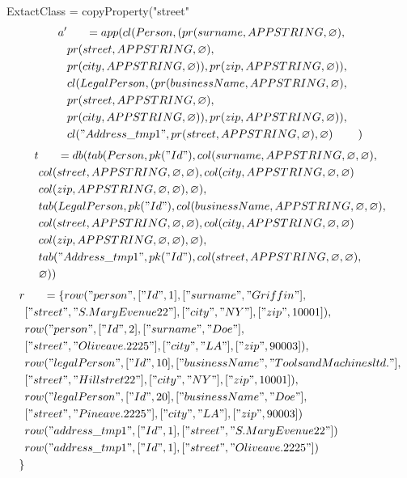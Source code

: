 \documentclass[11pt]{article}
\begin{document}
\newpage
ExtactClass = copyProperty("street"
\hline
\begin{align*}
a' & \;\;\;\;\;\; =app(cl(Person, (pr(surname, APPSTRING, \varnothing), \\
& pr(street, APPSTRING, \varnothing), \\
& pr(city, APPSTRING, \varnothing)), pr(zip, APPSTRING, \varnothing)), \\
& cl(LegalPerson, (pr(businessName, APPSTRING, \varnothing), \\
& pr(street, APPSTRING, \varnothing), \\
& pr(city, APPSTRING, \varnothing)), pr(zip, APPSTRING, \varnothing)), \\
& cl("Address\_tmp1", pr(street, APPSTRING, \varnothing) , \varnothing)
& )
\end{align*}
\begin{align*}
t & \;\;\;\;\;\; =db(tab(Person, pk("Id"), col(surname, APPSTRING, \varnothing, \varnothing), \\
& col(street, APPSTRING, \varnothing, \varnothing), col(city, APPSTRING, \varnothing, \varnothing) \\
& col(zip, APPSTRING, \varnothing, \varnothing), \varnothing), \\
& tab(LegalPerson, pk("Id"),  col(businessName, APPSTRING, \varnothing, \varnothing), \\
& col(street, APPSTRING, \varnothing, \varnothing), col(city, APPSTRING, \varnothing, \varnothing) \\
& col(zip, APPSTRING, \varnothing, \varnothing), \varnothing), \\
& tab("Address\_tmp1", pk("Id"), col(street, APPSTRING, \varnothing, \varnothing),\\
& \varnothing)) 
\end{align*}
\begin{align*}
r & \;\;\;\;\;\; =\{ row("person", ["Id", 1], ["surname", "Griffin"], \\
& ["street", "S. Mary Evenue 22"], ["city", "NY"], ["zip", 10001]), \\
& row("person", ["Id", 2], ["surname", "Doe"], \\
& ["street", "Olive ave. 2225"], ["city", "LA"], ["zip", 90003]), \\
& row("legalPerson", ["Id", 10], ["businessName", "Tools and Machines ltd."], \\
& ["street", "Hill stret 22"], ["city", "NY"], ["zip", 10001]), \\
& row("legalPerson", ["Id", 20], ["businessName", "Doe"], \\
& ["street", "Pine ave. 2225"], ["city", "LA"], ["zip", 90003])\\
& row("address\_tmp1", ["Id", 1], ["street", "S. Mary Evenue 22"]) \\
& row("address\_tmp1", ["Id", 1], ["street", "Olive ave. 2225"] )\\
\}
\end{align*}
\end{document}
